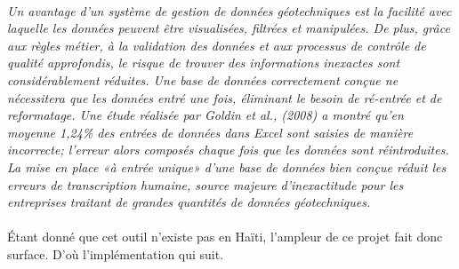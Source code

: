 \paragraph{}
\textit{Un avantage d'un système de gestion de données géotechniques est 
la facilité avec laquelle les données 
peuvent être visualisées, filtrées et manipulées.
De plus, grâce aux règles métier, à la validation des données et aux 
processus de contrôle de qualité approfondis, le risque de trouver
des informations inexactes sont considérablement réduites. Une base de 
données correctement conçue ne nécessitera que les données
entré une fois, éliminant le besoin de ré-entrée et de reformatage. Une 
étude réalisée par Goldin et al.,
(2008) a montré qu'en moyenne 1,24\% des entrées de données dans Excel 
sont saisies de manière incorrecte; l'erreur alors
composés chaque fois que les données sont réintroduites. La mise en place 
«à entrée unique» d’une base de données bien conçue réduit les erreurs de 
transcription humaine, source majeure d’inexactitude pour les entreprises
traitant de grandes quantités de données géotechniques.}
\cite{keen2015development}
\paragraph{}
Étant donné que cet outil n'existe pas 
en Haïti, l'ampleur de ce projet fait donc surface.
D'où l'implémentation qui suit.